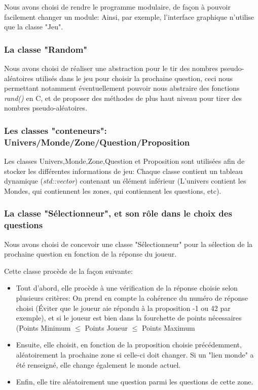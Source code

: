 Nous avons choisi de rendre le programme modulaire, de façon à pouvoir facilement changer un module: Ainsi, par exemple, l'interface graphique n'utilise que la classe "Jeu".
\subsubsection{La classe "Random"}
Nous avons choisi de réaliser une abstraction pour le tir des nombres pseudo-aléatoires utilisés dans le jeu pour choisir la prochaine question, ceci nous permettant notamment éventuellement pouvoir nous abstraire des fonctions \textit{rand()} en C, et de proposer des méthodes de plus haut niveau pour tirer des nombres pseudo-aléatoires.

\subsubsection{Les classes "conteneurs": Univers/Monde/Zone/Question/Proposition}
Les classes Univers,Monde,Zone,Question et Proposition sont utilisées afin de stocker les différentes informations de jeu: Chaque classe contient un tableau dynamique (\textit{std::vector}) contenant un élément inférieur (L'univers contient les Mondes, qui contiennent les zones, qui contiennent les questions, etc).

\subsubsection{La classe "Sélectionneur", et son rôle dans le choix des questions}
Nous avons choisi de concevoir une classe "Sélectionneur" pour la sélection de la prochaine question en fonction de la réponse du joueur.

Cette classe procède de la façon suivante: 
\begin{itemize}
	\item Tout d'abord, elle procède à une vérification de la réponse choisie selon plusieurs critères: On prend en compte la cohérence du numéro de réponse choisi (Éviter que le joueur aie répondu à la proposition -1 ou 42 par exemple), et si le joueur est bien dans la fourchette de points nécessaires (Points Minimum $\leq$  Points Joueur $\leq$ Points Maximum 
	\item Ensuite, elle choisit, en fonction de la proposition choisie précédemment, aléatoirement la prochaine zone si celle-ci doit changer. Si un "lien monde" a été renseigné, elle change également le monde actuel.
	\item Enfin, elle tire aléatoirement une question parmi les questions de cette zone.  
\end{itemize}
